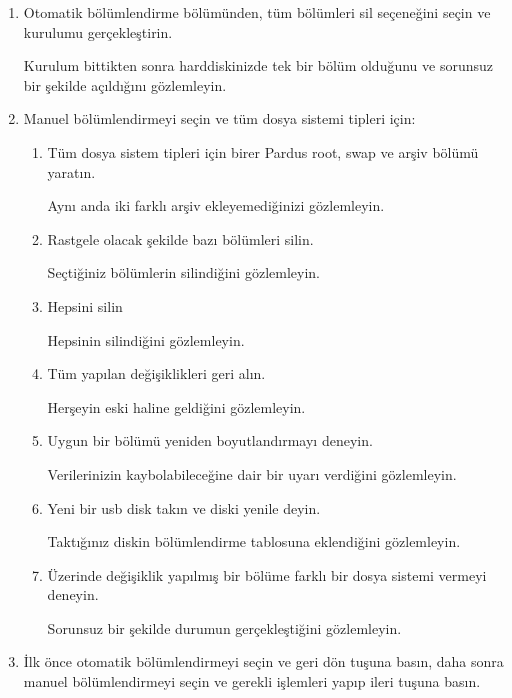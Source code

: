 \documentclass[a4paper,10pt]{article}
\begin{document}
\begin{enumerate}
\begin{enumerate}
\begin{enumerate}

        \end{enumerate}
        \item Otomatik bölümlendirme bölümünden, tüm bölümleri sil seçeneğini seçin ve kurulumu gerçekleştirin.
	
	Kurulum bittikten sonra harddiskinizde tek bir bölüm olduğunu ve sorunsuz bir şekilde açıldığını gözlemleyin.

        \item Manuel bölümlendirmeyi seçin ve tüm dosya sistemi tipleri için:
        \begin{enumerate}
            \item Tüm dosya sistem tipleri için birer Pardus root, swap ve arşiv bölümü yaratın.

		Aynı anda iki farklı arşiv ekleyemediğinizi gözlemleyin.
	    \item Rastgele olacak şekilde bazı bölümleri silin.
		
		Seçtiğiniz bölümlerin silindiğini gözlemleyin.
            \item Hepsini silin
	
		Hepsinin silindiğini gözlemleyin.
            \item Tüm yapılan değişiklikleri geri alın.
	
		Herşeyin eski haline geldiğini gözlemleyin.
            \item Uygun bir bölümü yeniden boyutlandırmayı deneyin.
	
		Verilerinizin kaybolabileceğine dair bir uyarı verdiğini gözlemleyin. 
            \item Yeni bir usb disk takın ve diski yenile deyin.

		Taktığınız diskin bölümlendirme tablosuna eklendiğini gözlemleyin.

            \item Üzerinde değişiklik yapılmış bir bölüme farklı bir dosya sistemi vermeyi deneyin.

		Sorunsuz bir şekilde durumun gerçekleştiğini gözlemleyin.
        \end{enumerate}
        \item İlk önce otomatik bölümlendirmeyi seçin ve geri dön tuşuna basın, daha sonra manuel bölümlendirmeyi seçin ve gerekli işlemleri yapıp ileri tuşuna basın.


\end{enumerate}
\end{enumerate}
\end{document}
